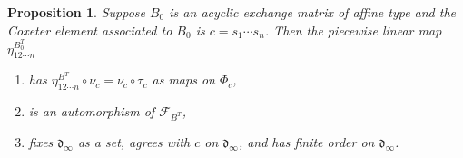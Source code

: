\documentclass{amsart}
\newtheorem{proposition}{Proposition}[section]
\theoremstyle{definition}
\theoremstyle{remark}
\numberwithin{equation}{section}
\newcommand{\set}[1]{{\lbrace #1 \rbrace}}
\newcommand{\br}[1]{{\langle #1 \rangle}}
\newcommand{\F}{{\mathcal F}}
\newcommand{\0}{{\mathbf{0}}}
\renewcommand{\d}{{\mathfrak d}}
\newcommand{\fin}{\mathrm{fin}}
\newcommand{\RSChar}{\Phi}
\newcommand{\RS}{\RSChar}
\newcommand{\RSfin}{\RS_\fin}
\newcommand{\AP}[1]{\RS_{#1}}
\begin{document}
\begin{proposition}\label{eta nice} 
Suppose $B_0$ is an acyclic exchange matrix of affine type and the Coxeter element associated to $B_0$ is $c=s_1\cdots s_n$.
Then the piecewise linear map $\eta^{B_0^T}_{12\cdots n}$
\begin{enumerate}[label=\bf\arabic*., ref=\arabic*]
\item \label{nu tau}   
has $\eta^{B^T}_{12\cdots n}\circ\nu_c=\nu_c\circ\tau_c$ as maps on $\AP{c}$, 
\item\label{eta aut mut}
is an automorphism of $\F_{B^T}$,
\item\label{eta is c}
fixes $\d_\infty$ as a set, agrees with $c$ on $\d_\infty$, and has finite order on $\d_\infty$.
\end{enumerate}
\end{proposition}
\end{document}
